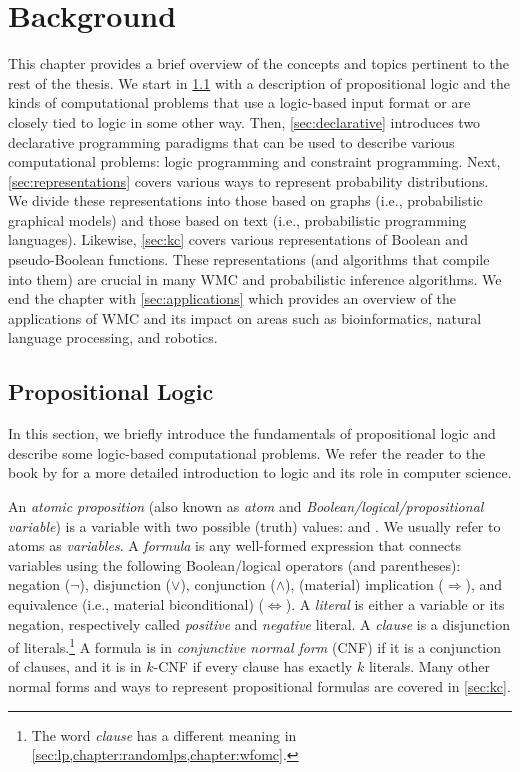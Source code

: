 \chapter{Background}\label{chapter:background}


This chapter provides a brief overview of the concepts and topics pertinent to
the rest of the thesis. We start in \cref{sec:proplogic} with a description of
propositional logic and the kinds of computational problems that use a
logic-based input format or are closely tied to logic in some other way. Then,
\cref{sec:declarative} introduces two declarative programming paradigms that can
be used to describe various computational problems: logic programming and
constraint programming. Next, \cref{sec:representations} covers various ways to
represent probability distributions. We divide these representations into those
based on graphs (i.e., probabilistic graphical models) and those based on text
(i.e., probabilistic programming languages). Likewise, \cref{sec:kc} covers
various representations of Boolean and pseudo-Boolean functions. These
representations (and algorithms that compile into them) are crucial in many WMC
and probabilistic inference algorithms. We end the chapter with
\cref{sec:applications} which provides an overview of the applications of WMC
and its impact on areas such as bioinformatics, natural language processing, and
robotics.

\section{Propositional Logic}\label{sec:proplogic}

In this section, we briefly introduce the fundamentals of propositional logic
and describe some logic-based computational problems. We refer the reader to the
book by \citet{DBLP:books/daglib/0029942} for a more detailed introduction to
logic and its role in computer science.

An \emph{atomic proposition} (also known as \emph{atom} and
\emph{Boolean/logical/propositional variable}) is a variable with two possible
(truth) values: \true{} and \false{}. We usually refer to atoms as
\emph{variables}. A \emph{formula} is any well-formed expression that connects
variables using the following Boolean/logical operators (and parentheses):
negation ($\neg$), disjunction ($\lor$), conjunction ($\land$), (material)
implication ($\Rightarrow$), and equivalence (i.e., material biconditional)
($\Leftrightarrow$). A \emph{literal} is either a variable or its negation,
respectively called \emph{positive} and \emph{negative} literal. A \emph{clause}
is a disjunction of literals.\footnote{The word \emph{clause} has a different
  meaning in \cref{sec:lp,chapter:randomlps,chapter:wfomc}.} A formula is in
\emph{conjunctive normal form} (CNF) if it is a conjunction of clauses, and it
is in $k$-CNF if every clause has exactly $k$ literals. Many other normal forms
and ways to represent propositional formulas are covered in \cref{sec:kc}.

